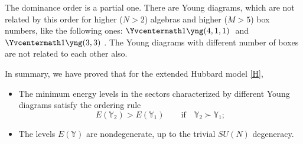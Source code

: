 \documentclass[11pt]{article}
\newcommand{\yn}{\mathbb{Y}}
\newcommand{\yc}{\Yvcentermath1}
\begin{document}
The dominance order is a partial one. There are Young diagrams, which are
not related by this order for higher ($N>2$) algebras and higher ($M>5$) box numbers,
like the following ones:
{\tiny $\yc \yng(4,1,1)\;$} and {\tiny $\yc \yng(3,3)\;$}.
The  Young diagrams with dif\/ferent number of boxes are not related to each other also.


In summary, we have proved that for the extended Hubbard model \eqref{H},
\begin{itemize}\itemsep=0pt
\item
The minimum energy levels in the sectors characterized by dif\/ferent
Young diagrams satisfy the ordering rule
\begin{equation}
\label{lm}
E(\yn_2)>E(\yn_1)\qquad \text{if} \quad \yn_2\succ \yn_1;
\end{equation}
\item
The levels $E(\yn)$ are nondegenerate, up to the trivial $SU(N)$ degeneracy.
\end{itemize}
\end{document}
